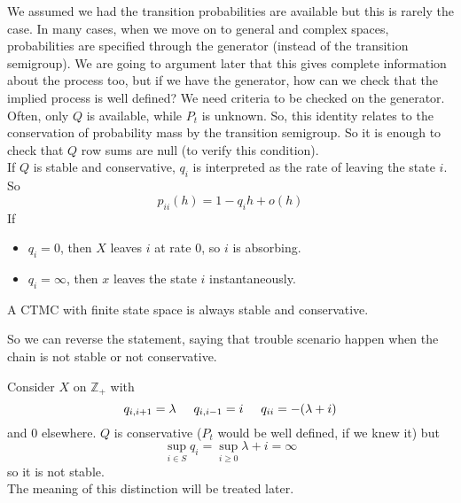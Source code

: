 \documentclass{article}
\begin{document}
	We assumed we had the transition probabilities are available but this is rarely the case. In many cases, when we move on to general and complex spaces, probabilities are specified through the generator (instead of the transition semigroup).
	We are going to argument later that this gives complete information about the process too, but if we have the generator, how can we check that the implied process is well defined? We need criteria to be checked on the generator. Often, only $Q$ is available, while $P_t$ is unknown. So, this identity relates to the conservation of probability mass by the transition semigroup. So it is enough to check that $Q$ row sums are null (to verify this condition). \\
	If $Q$ is stable and conservative, $q_i$ is interpreted as the rate of leaving the state $i$. So
	\begin{equation*}
		p_{ii}(h) = 1-q_i h + o(h) 
	\end{equation*}
	If 
	\begin{itemize}
		\item $q_i = 0$, then $X$ leaves $i$ at rate $0$, so $i$ is absorbing. 
		\item $q_i = \infty$, then $x$ leaves the state $i$ instantaneously. 
	\end{itemize}
	\begin{proposition}
		A CTMC with finite state space is always stable and conservative.
	\end{proposition}
	So we can reverse the statement, saying that trouble scenario happen when the chain is not stable or not  conservative.
	\begin{example}
		Consider $X$ on $\mathbb{Z}_+$ with 
		\begin{equation*}
			q_{i,i+1}= \lambda \hspace{0.5 cm} q_{i,i-1}= i \hspace{0.5 cm} q_{ii}= -(\lambda + i)
		\end{equation*}
		and $0$ elsewhere. $Q$ is conservative ($P_t$ would be well defined, if we knew it) but 
		\begin{equation*}
			\sup_{i \in S} q_i = \sup_{i \geqslant 0} \lambda + i = \infty
		\end{equation*}
		so it is not stable. \\
		The meaning of this distinction will be treated later.
	\end{example}
\end{document}
